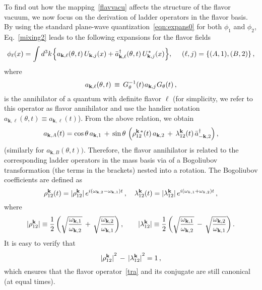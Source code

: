\documentclass[floats,prd,aps,amssymb,nofootinbib,showkeys]{revtex4}
\newcommand{\be}{\begin{equation}}\newcommand{\ee}{\end{equation}}
\def\bogubst{{\rho}^{*}_{\bk}}
\def\bogub{{\rho}_{\bk}}
\def\bogvb{{\lambda}_{\bk}}
\def\ebogomeno{e^{i\left(\omega_{\bk,2}-\omega_{\bk,1}\right) t}}
\def\ebogopiu{e^{i\left(\omega_{k,1}+\omega_{k,2}\right) t}}
\def\uuu{U}
\def\bogubst{{\rho}^{\bf{k}\, *}_{12}}
\def\bogub{{\rho}^{\bf{k}}_{12}}
\def\bogvb{{\lambda}^{\bf{k}}_{12}}
\def\uuu{U}
\begin{document}
To find out how the mapping~\eqref{flavvacu}
affects the structure of the flavor
vacuum, we now focus on the derivation of ladder operators in the flavor basis. By using the standard plane-wave
quantization~\eqref{eqn:expans0} for both $\phi_1$ and $\phi_2$,  
Eq.~\eqref{mixing2} leads to the following
expansions for the flavor fields
\be
\label{eqn:dynamicalmap2}
\phi_\ell(x)=\int d^{3}{k}\hspace{0.2mm}\Big\{a_{\textbf{k},\ell}(\theta, t)\, \uuu_{\textbf{k},j}(x)+ \bar a_{\textbf{k},\ell}^\dagger(\theta, t)\, \uuu_{\textbf{k},j}^{\hspace{0.1mm}*}(x) \Big\},\,\, \quad (\ell,j)=\left\{(A,1),(B,2)\right\},
\ee
where
\be
\label{tra}
a_{\textbf{k},\ell}(\theta, t)\,\equiv\, G^{-1}_{\theta}(t)\hspace{0.2mm}a_{\textbf k,j}\hspace{0.2mm}G_{\theta}(t)\,, 
\ee
is the annihilator of a quantum with definite flavor $\ell$
(for simplicity, we refer to this operator as flavor annihilator
and use the handier notation $a_{\textbf{k},\ell}(\theta, t)\equiv a_{\textbf{k},\ell}(t)$). From the above relation, 
we obtain 
\be
a _{{\bk},A}(t)=\cos\theta\, a _{{\bk},1}\,+\,\sin\theta\, \left(\bogubst(t)\, a _{{\bk},2}\, + \, \bogvb(t)\, \bar a^\dagger _{-{\bk},2}\right),
\label{aka}
\ee
(similarly for $a_{\textbf{k},B}(\theta, t))$. Therefore, 
the flavor annihilator is
related to the corresponding ladder operators
in the mass basis via of a Bogoliubov
transformation (the terms in the brackets) nested into a rotation.
The Bogoliubov coefficients are defined as
\begin{equation}
\label{bogoco}
\bogub(t)=|\bogub|\, \ebogomeno\,,\quad
\bogvb(t)=|\bogvb|\, \ebogopiu\,,
\end{equation}
where 
\be
\label{bocoeffi}
|\bogub|\equiv\frac{1}{2}\left( \sqrt{\frac{\omega_{\bk,1}}{\omega_{\bk,2}}}\,+\,\sqrt{\frac{\omega_{\bk,2}}{\omega_{\bk,1}}}\right),\qquad |\bogvb|\equiv\frac{1}{2}\left( \sqrt{\frac{\omega_{\bk,1}}{\omega_{\bk,2}}}\,-\,\sqrt{\frac{\omega_{\bk,2}}{\omega_{\bk,1}}}\right). 
\ee
It is easy to verify that
\be
{|\bogub|}^2\,-\,{|\bogvb|}^2=1\,, 
\label{eqn:iper}
\ee
which ensures that the flavor operator~\eqref{tra}
and its conjugate are still canonical (at equal times).
\end{document}
